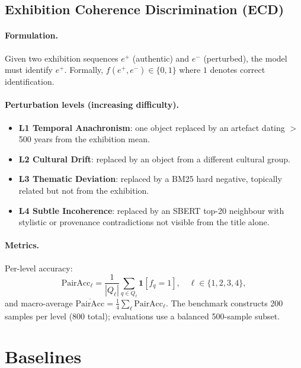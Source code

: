 \documentclass[11pt]{article}
\newcommand{\ecd}{\textsc{ECD}}
\begin{document}
\subsection{Exhibition Coherence Discrimination (\ecd{})}
\label{sec:ecd}

\paragraph{Formulation.}
Given two exhibition sequences $e^+$ (authentic) and $e^-$ (perturbed),
the model must identify $e^+$.
Formally, $f(e^+, e^-) \in \{0, 1\}$ where $1$ denotes correct
identification.

\paragraph{Perturbation levels (increasing difficulty).}
\begin{itemize}[noitemsep,topsep=2pt,leftmargin=1em]
  \item \textbf{L1 Temporal Anachronism}: one object replaced by an artefact dating $>$500 years from the exhibition mean.
  \item \textbf{L2 Cultural Drift}: replaced by an object from a different cultural group.
  \item \textbf{L3 Thematic Deviation}: replaced by a BM25 hard negative, topically related but not from the exhibition.
  \item \textbf{L4 Subtle Incoherence}: replaced by an SBERT top-20 neighbour with stylistic or provenance contradictions not visible from the title alone.
\end{itemize}

\paragraph{Metrics.}
Per-level accuracy:
\begin{equation}
\text{PairAcc}_\ell = \frac{1}{|Q_\ell|} \sum_{q \in Q_\ell} \mathbf{1}[f_q = 1],
\quad \ell \in \{1,2,3,4\},
\label{eq:pairacc}
\end{equation}
and macro-average $\overline{\text{PairAcc}} = \frac{1}{4}\sum_\ell \text{PairAcc}_\ell$.
The benchmark constructs 200 samples per level (800 total); evaluations use a balanced 500-sample subset.

\section{Baselines}
\label{sec:baselines}
\end{document}
